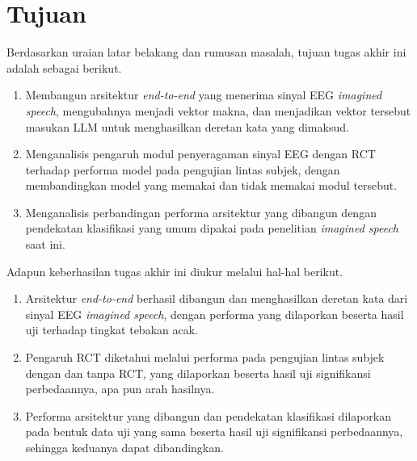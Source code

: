 \section{Tujuan}
\label{sec:tujuan}
Berdasarkan uraian latar belakang dan rumusan masalah, tujuan tugas akhir ini adalah sebagai berikut.
\begin{enumerate}
    \item Membangun arsitektur \textit{end-to-end} yang menerima sinyal EEG \textit{imagined speech}, mengubahnya menjadi vektor makna, dan menjadikan vektor tersebut masukan LLM untuk menghasilkan deretan kata yang dimaksud.
    \item Menganalisis pengaruh modul penyeragaman sinyal EEG dengan RCT terhadap performa model pada pengujian lintas subjek, dengan membandingkan model yang memakai dan tidak memakai modul tersebut.
    \item Menganalisis perbandingan performa arsitektur yang dibangun dengan pendekatan klasifikasi yang umum dipakai pada penelitian \textit{imagined speech} saat ini.
\end{enumerate}

Adapun keberhasilan tugas akhir ini diukur melalui hal-hal berikut.
\begin{enumerate}
    \item Arsitektur \textit{end-to-end} berhasil dibangun dan menghasilkan deretan kata dari sinyal EEG \textit{imagined speech}, dengan performa yang dilaporkan beserta hasil uji terhadap tingkat tebakan acak.
    \item Pengaruh RCT diketahui melalui performa pada pengujian lintas subjek dengan dan tanpa RCT, yang dilaporkan beserta hasil uji signifikansi perbedaannya, apa pun arah hasilnya.
    \item Performa arsitektur yang dibangun dan pendekatan klasifikasi dilaporkan pada bentuk data uji yang sama beserta hasil uji signifikansi perbedaannya, sehingga keduanya dapat dibandingkan.
\end{enumerate}

